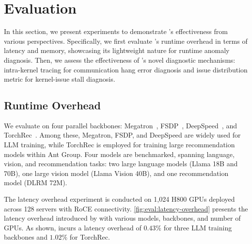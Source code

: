 

\section{Evaluation}
In this section, we present experiments to demonstrate \sysname{}’s effectiveness from various perspectives.
Specifically, we first evaluate \sysname{}’s runtime overhead in terms of latency and memory, showcasing its lightweight nature for runtime anomaly diagnosis.
Then, we assess the effectiveness of \sysname{}’s novel diagnostic mechanisms: intra-kernel tracing for communication hang error diagnosis and issue distribution metric for kernel-issue stall diagnosis.

\subsection{Runtime Overhead}
\label{sec:eval:overhead}

We evaluate \sysname{} on four parallel backbones: Megatron~\cite{shoeybiMegatronLMTraining}, FSDP~\cite{zhaoPyTorchFSDP}, DeepSpeed~\cite{rajbhandariZeROMemory}, and TorchRec~\cite{ivchenkoTorchRecPyTorch}. Among these, Megatron, FSDP, and DeepSpeed are widely used for LLM training, while TorchRec is employed for training large recommendation models within Ant Group. Four models are benchmarked, spanning language, vision, and recommendation tasks: two large language models (Llama 18B and 70B), one large vision model (Llama Vision 40B), and one recommendation model (DLRM 72M).

The latency overhead experiment is conducted on 1,024 H800 GPUs deployed across 128 servers with RoCE connectivity. \autoref{fig:eval:latency-overhead} presents the latency overhead introduced by \sysname{} with various models, backbones, and number of GPUs. As shown, \sysname{} incurs a latency overhead of $0.43\%$ for three LLM training backbones and $1.02\%$ for TorchRec.




